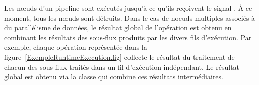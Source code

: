 Les nœuds d'un pipeline sont ex\'ecut\'es jusqu'\`a ce qu'ils re\c coivent le signal . \`A ce moment, tous les nœuds sont d\'etruits. Dans le cas de noeuds multiples associ\'es \`a du parall\'elisme de donn\'ees, le r\'esultat global de l'op\'eration est obtenu en combinant les r\'esultats des sous-flux produits par les divers fils d'ex\'ecution. Par exemple, chaque op\'eration  repr\'esent\'ee dans la figure~\ref{ExempleRuntimeExecution.fig} collecte le r\'esultat du traitement de chacun des sous-flux trait\'es dans un fil d'ex\'ecution ind\'ependant. Le r\'esultat global est obtenu via la classe  qui combine ces r\'esultats interm\'ediaires.

